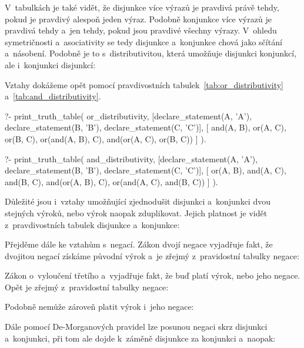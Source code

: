 V~tabulkách je také vidět, že disjunkce více výrazů je pravdivá právě tehdy, pokud je pravdivý alespoň jeden výraz. Podobně konjunkce více výrazů je pravdivá tehdy a~jen tehdy, pokud jsou pravdivé všechny výrazy. V~ohledu symetričnosti a~asociativity se tedy disjunkce a~konjunkce chová jako sčítání a~násobení. Podobně je to s~distributivitou, která umožňuje  disjunkci konjunkcí, ale i~konjunkci disjunkcí:


Vztahy dokážeme opět pomocí pravdivostních tabulek~\ref{tab:or_distributivity} a~\ref{tab:and_distributivity}.

\begin{prolog}
?- print_truth_table(
	or_distributivity,
	[declare_statement(A, 'A'), declare_statement(B, 'B'), declare_statement(C, 'C')],
	[
		and(A, B),
		or(A, C),
		or(B, C),
		or(and(A, B), C),
		and(or(A, C), or(B, C))
	]
).
\end{prolog}

\begin{prolog}
?- print_truth_table(
	and_distributivity,
	[declare_statement(A, 'A'), declare_statement(B, 'B'), declare_statement(C, 'C')],
	[
		or(A, B),
		and(A, C),
		and(B, C),
		and(or(A, B), C),
		or(and(A, C), and(B, C))
	]
).
\end{prolog}

Důležité jsou i~vztahy umožňující zjednodušit disjunkci a~konjunkci dvou stejných výroků, nebo výrok naopak zduplikovat. Jejich platnost je vidět z~pravdivostních tabulek disjunkce a~konjunkce:


Přejděme dále ke vztahům s~negací. Zákon dvojí negace vyjadřuje fakt, že dvojitou negací získáme původní výrok a~je zřejmý z~pravidostní tabulky negace:


Zákon o~vyloučení třetího a~vyjadřuje fakt, že buď platí výrok, nebo jeho negace. Opět je zřejmý z~pravidostní tabulky negace:


Podobně nemůže zároveň platit výrok i~jeho negace: 


Dále pomocí De-Morganových pravidel lze posunou negaci skrz disjunkci a~konjunkci, při tom ale dojde k~záměně disjunkce za konjunkci a~naopak:

